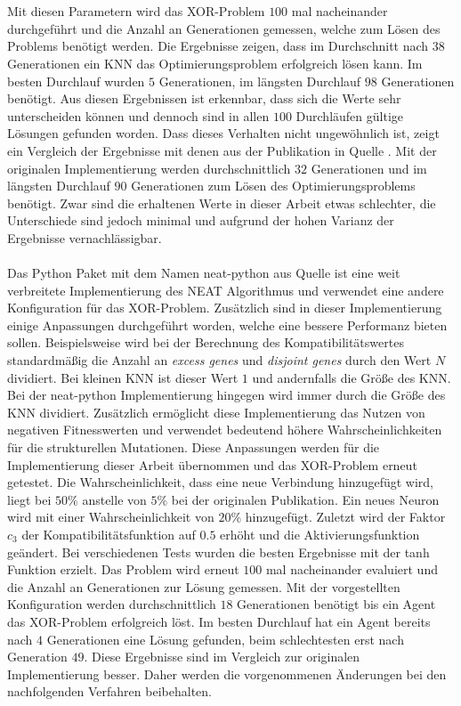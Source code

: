 \\\\ %
Mit diesen Parametern wird das XOR-Problem $100$ mal nacheinander durchgeführt und die Anzahl an Generationen gemessen, welche zum Lösen des Problems benötigt werden. Die Ergebnisse zeigen, dass im Durchschnitt nach $38$ Generationen ein \ac{KNN} das Optimierungsproblem erfolgreich lösen kann. Im besten Durchlauf wurden $5$ Generationen, im längsten Durchlauf $98$ Generationen benötigt. Aus diesen Ergebnissen ist erkennbar, dass sich die Werte sehr unterscheiden können und dennoch sind in allen $100$ Durchläufen gültige Lösungen gefunden worden. Dass dieses Verhalten nicht ungewöhnlich ist, zeigt ein Vergleich der Ergebnisse mit denen aus der Publikation in Quelle \cite{stanley2002evolving}. Mit der originalen Implementierung werden durchschnittlich $32$ Generationen und im längsten Durchlauf $90$ Generationen zum Lösen des Optimierungsproblems benötigt. Zwar sind die erhaltenen Werte in dieser Arbeit etwas schlechter, die Unterschiede sind jedoch minimal und aufgrund der hohen Varianz der Ergebnisse vernachlässigbar.
\\\\
Das Python Paket mit dem Namen neat-python aus Quelle \cite{mcintyre_neatpython} ist eine weit verbreitete Implementierung des \ac{NEAT} Algorithmus und verwendet eine andere Konfiguration für das XOR-Problem. Zusätzlich sind in dieser Implementierung einige Anpassungen durchgeführt worden, welche eine bessere Performanz bieten sollen. Beispielsweise wird bei der Berechnung des Kompatibilitätswertes standardmäßig die Anzahl an \emph{excess genes} und \emph{disjoint genes} durch den Wert $N$ dividiert. Bei kleinen \ac{KNN} ist dieser Wert $1$ und andernfalls die Größe des \ac{KNN}. Bei der neat-python Implementierung hingegen wird immer durch die Größe des \ac{KNN} dividiert. Zusätzlich ermöglicht diese Implementierung das Nutzen von negativen Fitnesswerten und verwendet bedeutend höhere Wahrscheinlichkeiten für die strukturellen Mutationen. Diese Anpassungen werden für die Implementierung dieser Arbeit übernommen und das XOR-Problem erneut getestet. Die Wahrscheinlichkeit, dass eine neue Verbindung hinzugefügt wird, liegt bei $50\%$ anstelle von $5\%$ bei der originalen Publikation. Ein neues Neuron wird mit einer Wahrscheinlichkeit von $20\%$ hinzugefügt. Zuletzt wird der Faktor $c_3$ der Kompatibilitätsfunktion auf $0.5$ erhöht und die Aktivierungsfunktion geändert. Bei verschiedenen Tests wurden die besten Ergebnisse mit der \ac{tanh} Funktion erzielt. Das Problem wird erneut $100$ mal nacheinander evaluiert und die Anzahl an Generationen zur Lösung gemessen. Mit der vorgestellten Konfiguration werden durchschnittlich $18$ Generationen benötigt bis ein Agent das XOR-Problem erfolgreich löst. Im besten Durchlauf hat ein Agent bereits nach $4$ Generationen eine Lösung gefunden, beim schlechtesten erst nach Generation $49$. Diese Ergebnisse sind im Vergleich zur originalen Implementierung besser. Daher werden die vorgenommenen Änderungen bei den nachfolgenden Verfahren beibehalten.
